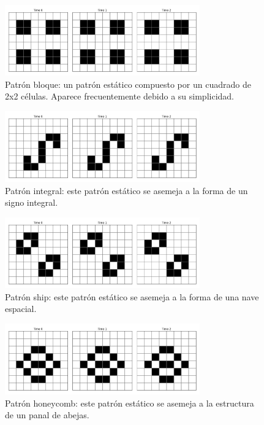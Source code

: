 \documentclass[]{article}
\begin{document}
\begin{figure}[H]
  \centering
  \includegraphics[width=0.75\textwidth]{../assets/still_life/block/block.png}
  \caption{Patrón bloque: un patrón estático compuesto por un cuadrado de 2x2 células. Aparece frecuentemente debido a su simplicidad.}
  \label{fig:block}
\end{figure}

\begin{figure}[H]
  \centering
  \includegraphics[width=0.75\textwidth]{../assets/still_life/integral/integral.png}
  \caption{Patrón integral: este patrón estático se asemeja a la forma de un signo integral.}
  \label{fig:integral}
\end{figure}

\begin{figure}[H]
  \centering
  \includegraphics[width=0.75\textwidth]{../assets/still_life/ship/ship.png}
  \caption{Patrón ship: este patrón estático se asemeja a la forma de una nave espacial.}
  \label{fig:ship}
\end{figure}

\begin{figure}[H]
  \centering
  \includegraphics[width=0.75\textwidth]{../assets/still_life/honeycomb/honeycomb.png}
  \caption{Patrón honeycomb: este patrón estático se asemeja a la estructura de un panal de abejas.}
  \label{fig:honeycomb}
\end{figure}
\end{document}
